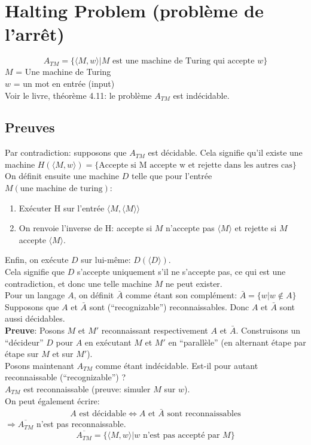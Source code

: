 \documentclass[a4paper,12pt]{article}
\begin{document}
\section{Halting Problem (problème de l'arrêt)}
  $$A_{TM} = \{ \langle M, w \rangle | M \text{ est une machine de Turing qui accepte } w\}$$
  $M$ = Une machine de Turing\\
  $w$ = un mot en entrée (input)\\
  Voir le livre, théorème 4.11: le problème $A_{TM}$ est indécidable.\\

  \subsection{Preuves}
    Par contradiction: supposons que $A_{TM}$ est décidable. Cela signifie qu'il existe une machine $H(\langle M,w\rangle) = \{\text{Accepte si M accepte w et rejette dans les autres cas}\}$\\
    On définit ensuite une machine $D$ telle que pour l'entrée $M (\text{une machine de turing})$:
    \begin{enumerate}
      \item Exécuter H sur l'entrée $\langle M, \langle M\rangle\rangle$
      \item On renvoie l'inverse de H: accepte si $M$ n'accepte pas $\langle M\rangle$ et rejette si $M$ accepte $\langle M\rangle$.
    \end{enumerate}
    Enfin, on exécute $D$ sur lui-même: $D(\langle D\rangle)$.\\
    Cela signifie que $D$ s'accepte uniquement s'il ne s'accepte pas, ce qui est une contradiction, et donc une telle machine $M$ ne peut exister.
  \\
  Pour un langage $A$, on définit $\bar{A}$ comme étant son complément: $\bar{A} = \{w | w \notin A\}$\\
  Supposons que $A$ et $\bar{A}$ sont (``recognizable'') reconnaissables.  Donc $A$ et $\bar{A}$ sont aussi décidables.\\
  \textbf{Preuve}: Posons $M$ et $M'$ reconnaissant respectivement $A$ et $\bar{A}$.  Construisons un ``décideur'' $D$ pour $A$ en exécutant $M$ et $M'$ en ``parallèle'' (en alternant étape par étape sur $M$ et sur $M'$).\\

  Posons maintenant $A_{TM}$ comme étant indécidable.  Est-il pour autant reconnaissable (``recognizable'') ?\\
  $A_{TM}$ est reconnaissable (preuve: simuler $M$ sur $w$).\\
  On peut également écrire:
  \begin{align*}
    A \text{ est décidable} \Leftrightarrow A \text{ et } \bar{A} \text{ sont reconnaissables}
  \end{align*}
  $\Rightarrow \overline {A_{TM}}$ n'est pas reconnaissable.\\
  $$\overline {A_{TM}} = \{\langle M, w\rangle | w \text{ n'est pas accepté par } M\}$$
\end{document}
